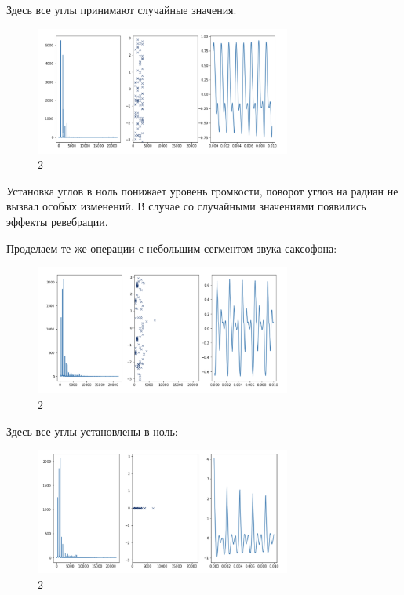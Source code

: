 \documentclass[10pt,a4paper,oneside]{article}
\begin{document}
Здесь все углы принимают случайные значения.

\begin{figure}[H]
        \centering
        \includegraphics[width=0.75\textwidth]{pics/22.png}
        \caption{2}
        \label{fig:first}
\end{figure}

Установка углов в ноль понижает уровень громкости, поворот углов на радиан не вызвал особых изменений. В случае со случайными значениями появились эффекты ревебрации.

Проделаем те же операции с небольшим сегментом звука саксофона:

\begin{figure}[H]
        \centering
        \includegraphics[width=0.75\textwidth]{pics/23.png}
        \caption{2}
        \label{fig:first}
\end{figure}

Здесь все углы установлены в ноль:

\begin{figure}[H]
        \centering
        \includegraphics[width=0.75\textwidth]{pics/24.png}
        \caption{2}
        \label{fig:first}
\end{figure}
\end{document}
